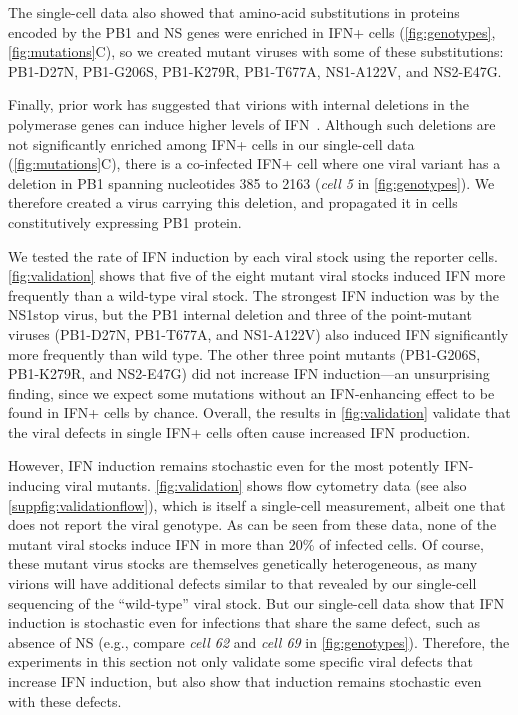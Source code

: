 \documentclass[]{asm-article}
\newcommand{\FIG}[1]{\autoref{fig:#1}}
\newcommand{\SUPPFIG}[1]{\autoref{suppfig:#1}}
\begin{document}
The single-cell data also showed that amino-acid substitutions in proteins encoded by the PB1 and NS genes were enriched in IFN+ cells (\FIG{genotypes}, \FIG{mutations}C), so we created mutant viruses with some of these substitutions:
PB1-D27N, PB1-G206S, PB1-K279R, PB1-T677A, NS1-A122V, and NS2-E47G.

Finally, prior work has suggested that virions with internal deletions in the polymerase genes can induce higher levels of IFN~\cite{wang2018cell, baum2010preference, tapia2013defective, boergeling2015evidence, dimmock2015cloned, liu2019inhibition}.
Although such deletions are not significantly enriched among IFN+ cells in our single-cell data (\FIG{mutations}C), there is a co-infected IFN+ cell where one viral variant has a deletion in PB1 spanning nucleotides 385 to 2163 (\textit{cell 5} in \FIG{genotypes}).
We therefore created a virus carrying this deletion, and propagated it in cells constitutively expressing PB1 protein.

We tested the rate of IFN induction by each viral stock using the reporter cells.
\FIG{validation} shows that five of the eight mutant viral stocks induced IFN more frequently than a wild-type viral stock.
The strongest IFN induction was by the NS1stop virus, but the PB1 internal deletion and three of the point-mutant viruses (PB1-D27N, PB1-T677A, and NS1-A122V) also induced IFN significantly more frequently than wild type.
The other three point mutants (PB1-G206S, PB1-K279R, and NS2-E47G) did not increase IFN induction---an unsurprising finding, since we expect some mutations without an IFN-enhancing effect to be found in IFN+ cells by chance.
Overall, the results in \FIG{validation} validate that the viral defects in single IFN+ cells often cause increased IFN production.

However, IFN induction remains stochastic even for the most potently IFN-inducing viral mutants.
\FIG{validation} shows flow cytometry data (see also \SUPPFIG{validationflow}), which is itself a single-cell measurement, albeit one that does not report the viral genotype.
As can be seen from these data, none of the mutant viral stocks induce IFN in more than 20\% of infected cells. 
Of course, these mutant virus stocks are themselves genetically heterogeneous, as many virions will have additional defects similar to that revealed by our single-cell sequencing of the ``wild-type'' viral stock.
But our single-cell data show that IFN induction is stochastic even for infections that share the same defect, such as absence of NS (e.g., compare \textit{cell 62} and \textit{cell 69} in \FIG{genotypes}).
Therefore, the experiments in this section not only validate some specific viral defects that increase IFN induction, but also show that induction remains stochastic even with these defects.
\end{document}
